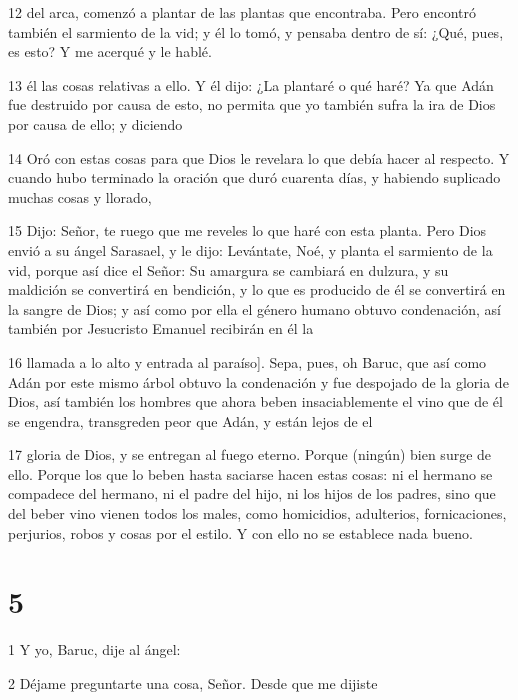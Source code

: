 \par 12 del arca, comenzó a plantar de las plantas que encontraba. Pero encontró también el sarmiento de la vid; y él lo tomó, y pensaba dentro de sí: ¿Qué, pues, es esto? Y me acerqué y le hablé.

\par 13 él las cosas relativas a ello. Y él dijo: ¿La plantaré o qué haré? Ya que Adán fue destruido por causa de esto, no permita que yo también sufra la ira de Dios por causa de ello; y diciendo

\par 14 Oró con estas cosas para que Dios le revelara lo que debía hacer al respecto. Y cuando hubo terminado la oración que duró cuarenta días, y habiendo suplicado muchas cosas y llorado,

\par 15 Dijo: Señor, te ruego que me reveles lo que haré con esta planta. Pero Dios envió a su ángel Sarasael, y le dijo: Levántate, Noé, y planta el sarmiento de la vid, porque así dice el Señor: Su amargura se cambiará en dulzura, y su maldición se convertirá en bendición, y lo que es producido de él se convertirá en la sangre de Dios; y así como por ella el género humano obtuvo condenación, así también por Jesucristo Emanuel recibirán en él la

\par 16 llamada a lo alto y entrada al paraíso]. Sepa, pues, oh Baruc, que así como Adán por este mismo árbol obtuvo la condenación y fue despojado de la gloria de Dios, así también los hombres que ahora beben insaciablemente el vino que de él se engendra, transgreden peor que Adán, y están lejos de el

\par 17 gloria de Dios, y se entregan al fuego eterno. Porque (ningún) bien surge de ello. Porque los que lo beben hasta saciarse hacen estas cosas: ni el hermano se compadece del hermano, ni el padre del hijo, ni los hijos de los padres, sino que del beber vino vienen todos los males, como homicidios, adulterios, fornicaciones, perjurios, robos y cosas por el estilo. Y con ello no se establece nada bueno.

\chapter{5}

\par 1 Y yo, Baruc, dije al ángel:

\par 2 Déjame preguntarte una cosa, Señor. Desde que me dijiste

